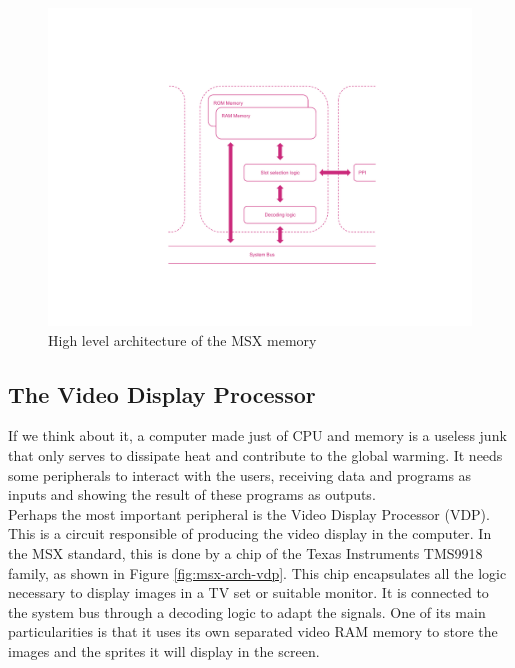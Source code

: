 \begin{figure}
	\centering
	\includegraphics[width=1\linewidth,trim={0cm 100 0 100}]{images/figures/msx-arch-memory}
	\caption{High level architecture of the MSX memory}
	\label{fig:msx-arch-memory}
\end{figure}

\subsection{The Video Display Processor}

If we think about it, a computer made just of CPU and memory is a useless junk that only serves to dissipate heat and contribute to the global warming. It needs some peripherals to interact with the users, receiving data and programs as inputs and showing the result of these programs as outputs. \\

Perhaps the most important peripheral is the Video Display Processor (VDP). This is a circuit responsible of producing the video display in the computer. In the MSX standard, this is done by a chip of the Texas Instruments TMS9918 family, as shown in Figure \ref{fig:msx-arch-vdp}. This chip encapsulates all the logic necessary to display images in a TV set or suitable monitor. It is connected to the system bus through a decoding logic to adapt the signals. One of its main particularities is that it uses its own separated video RAM memory to store the images and the sprites it will display in the screen. \\

